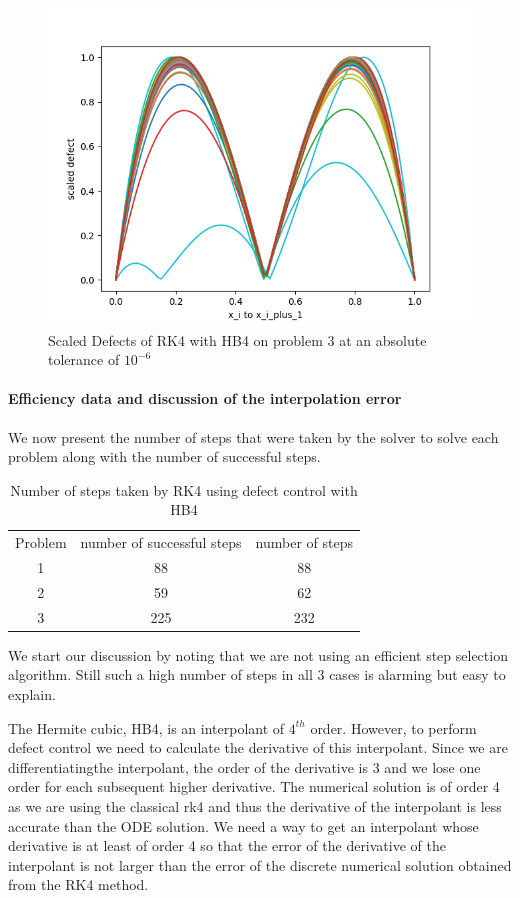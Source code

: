 \documentclass{article}
\begin{document}
\begin{figure}[H]
\centering
\includegraphics[width=0.7\linewidth]{./figures/rk4_with_hb4_p3_scaled_defects}
\caption{Scaled Defects of RK4 with HB4 on problem 3 at an absolute tolerance of $10^{-6}$}
\label{fig:rk4_with_hb4_p3_scaled_defects}
\end{figure}

\paragraph{Efficiency data and discussion of the interpolation error}
We now present the number of steps that were taken by the solver to solve each problem along with the number of successful steps.

\begin{table}[h]
\caption {Number of steps taken by RK4 using defect control with HB4} \label{tab:rk4_with_hb4_nsteps}
\begin{center}
\begin{tabular}{ c c c } 
Problem & number of successful steps & number of steps \\ 
1       & 88                         & 88 \\ 
2       & 59                         & 62 \\
3       & 225                        & 232 \\
\end{tabular}
\end{center}
\end{table}

We start our discussion by noting that we are not using an efficient step selection algorithm. Still such a high number of steps in all 3 cases is alarming but easy to explain.

The Hermite cubic, HB4, is an interpolant of $4^{th}$ order. However, to perform defect control we need to calculate the derivative of this interpolant. Since we are differentiatingthe interpolant, the order of the derivative is 3 and we lose one order for each subsequent higher derivative. The numerical solution is of order 4 as we are using the classical rk4 and thus the derivative of the interpolant is less accurate than the ODE solution. We need a way to get an interpolant whose derivative is at least of order 4 so that the error of the derivative of the interpolant is not larger than the error of the discrete numerical solution obtained from the RK4 method.
\end{document}
